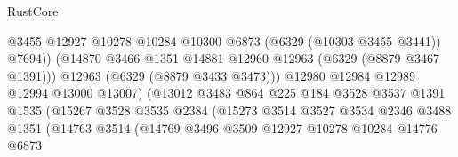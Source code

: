 \begin{lexlean}{RustCore}
\begin{coremodule}
                                            @3455
                                            @12927
                                            @10278
                                            @10284
                                            @10300
                                            @6873
                                            (@6329 (@10303 @3455 @3441))
                                            @7694))
                                        (@14870
                                          @3466
                                          @1351
                                          @14881
                                          @12960
                                          @12963
                                          (@6329 (@8879 @3467 @1391)))
                                        @12963
                                        (@6329 (@8879 @3433 @3473)))
                                      @12980
                                      @12984
                                      @12989
                                      @12994
                                      @13000
                                      @13007)
                                    (@13012
                                      @3483
                                      @864
                                      @225
                                      @184
                                      @3528
                                      @3537
                                      @1391
                                      @1535
                                      (@15267
                                        @3528
                                        @3535
                                        @2384
                                        (@15273
                                          @3514
                                          @3527
                                          @3534
                                          @2346
                                          @3488
                                          @1351
                                          (@14763
                                            @3514
                                            (@14769
                                              @3496
                                              @3509
                                              @12927
                                              @10278
                                              @10284
                                              @14776
                                              @6873

\end{coremodule}
\end{lexlean}

